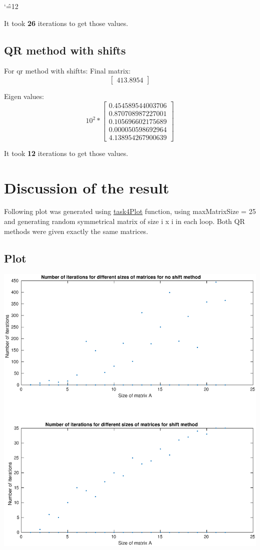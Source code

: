 \documentclass[12pt]{report}
\newenvironment{simplechar}{%
   \catcode`\^=12
}{}
\begin{document}
\begin{simplechar}
It took \textbf{26} iterations to get those values.

\subsection{QR method with shifts}
For qr method with shiftts:
Final matrix:
\[
\begin{bmatrix}
413.8954
\end{bmatrix}
\]

Eigen values:
\[
10^{2} *
\begin{bmatrix}
  0.454589544003706 \\
  0.870708987227001 \\
  0.105696602175689 \\
  0.000050598692964 \\
  4.138954267900639
\end{bmatrix}
\]

It took \textbf{12} iterations to get those values.

\newpage
\section{Discussion of the result}
Following plot was generated using \hyperlink{function4}{task4Plot} function, using maxMatrixSize = 25 and generating random symmetrical matrix of size i x i in each loop. Both QR methods were given exactly the same matrices.
\subsection{Plot}

\begin{center}
   \includegraphics[scale=0.5]{task4plot.eps}
\end{center}
\newpage

\end{simplechar}
\end{document}
